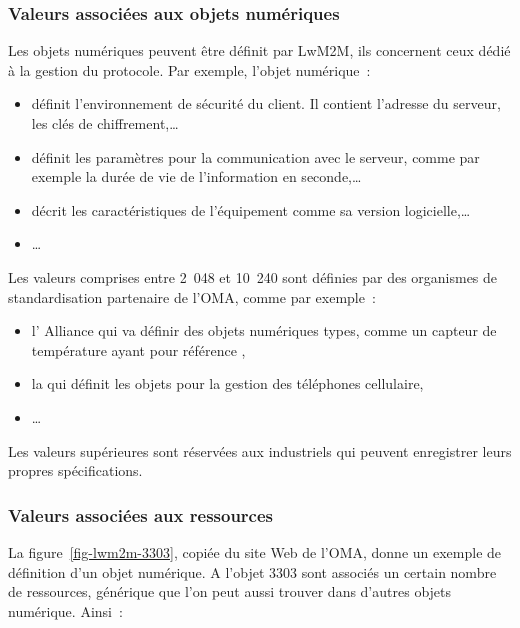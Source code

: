 \subsubsection{Valeurs associées aux objets numériques}
Les objets numériques peuvent être définit par LwM2M, ils concernent ceux dédié à la gestion du protocole. Par exemple, l'objet numérique~:

\begin{itemize}
    \item  \textit{} définit l'environnement de sécurité du client. Il contient l'adresse du serveur, les clés de chiffrement,\ldots
    \item \textit{} définit les paramètres pour la communication avec le serveur, comme par exemple la durée de vie de l'information en seconde,\ldots
    \item \textit{} décrit les caractéristiques de l'équipement comme sa version logicielle,\ldots
    \item \ldots
\end{itemize}

         \vspace{1em}


Les valeurs comprises entre 2~048 et 10~240 sont définies par des organismes de standardisation partenaire de l'\ac{OMA},  comme par exemple~:
\begin{itemize}
    \item l' Alliance qui va définir des objets numériques types, comme un capteur de température ayant pour référence \textit{},
    \item la  qui définit les objets pour la gestion des téléphones cellulaire,
    \item \ldots
\end{itemize}

Les valeurs supérieures sont réservées aux industriels qui peuvent enregistrer leurs propres spécifications.

\subsubsection{Valeurs associées aux ressources}

La figure~\vref{fig-lwm2m-3303}, copiée du site Web de l'\ac{OMA}, donne un exemple de définition d'un objet numérique. A l'objet 3303 sont associés un certain nombre de ressources, générique que l'on peut aussi trouver dans d'autres objets numérique. Ainsi~:


